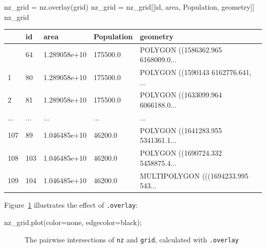 \documentclass[
  letterpaper,
]{krantz}
\newenvironment{Shaded}{\begin{snugshade}}{\end{snugshade}}
\newcommand{\NormalTok}[1]{\textcolor[rgb]{0.00,0.23,0.31}{#1}}
\newcommand{\OperatorTok}[1]{\textcolor[rgb]{0.37,0.37,0.37}{#1}}
\newcommand{\StringTok}[1]{\textcolor[rgb]{0.13,0.47,0.30}{#1}}
\begin{document}
\begin{Shaded}
\begin{Highlighting}[]
\NormalTok{nz\_grid }\OperatorTok{=}\NormalTok{ nz.overlay(grid)}
\NormalTok{nz\_grid }\OperatorTok{=}\NormalTok{ nz\_grid[[}\StringTok{\textquotesingle{}id\textquotesingle{}}\NormalTok{, }\StringTok{\textquotesingle{}area\textquotesingle{}}\NormalTok{, }\StringTok{\textquotesingle{}Population\textquotesingle{}}\NormalTok{, }\StringTok{\textquotesingle{}geometry\textquotesingle{}}\NormalTok{]]}
\NormalTok{nz\_grid}
\end{Highlighting}
\end{Shaded}

\begin{longtable}[]{@{}lllll@{}}
\toprule\noalign{}
& id & area & Population & geometry \\
\midrule\noalign{}
\endhead
\bottomrule\noalign{}
\endlastfoot
0 & 64 & 1.289058e+10 & 175500.0 & POLYGON ((1586362.965 6168009.0... \\
1 & 80 & 1.289058e+10 & 175500.0 & POLYGON ((1590143 6162776.641, ... \\
2 & 81 & 1.289058e+10 & 175500.0 & POLYGON ((1633099.964 6066188.0... \\
... & ... & ... & ... & ... \\
107 & 89 & 1.046485e+10 & 46200.0 & POLYGON ((1641283.955
5341361.1... \\
108 & 103 & 1.046485e+10 & 46200.0 & POLYGON ((1690724.332
5458875.4... \\
109 & 104 & 1.046485e+10 & 46200.0 & MULTIPOLYGON (((1694233.995
543... \\
\end{longtable}

Figure~\ref{fig-nz-and-grid-overlay} illustrates the effect of
\texttt{.overlay}:

\begin{Shaded}
\begin{Highlighting}[]
\NormalTok{nz\_grid.plot(color}\OperatorTok{=}\StringTok{\textquotesingle{}none\textquotesingle{}}\NormalTok{, edgecolor}\OperatorTok{=}\StringTok{\textquotesingle{}black\textquotesingle{}}\NormalTok{)}\OperatorTok{;}
\end{Highlighting}
\end{Shaded}

\begin{figure}[H]


\caption{\label{fig-nz-and-grid-overlay}The pairwise intersections of
\texttt{nz} and \texttt{grid}, calculated with \texttt{.overlay}}

\end{figure}%
\end{document}
